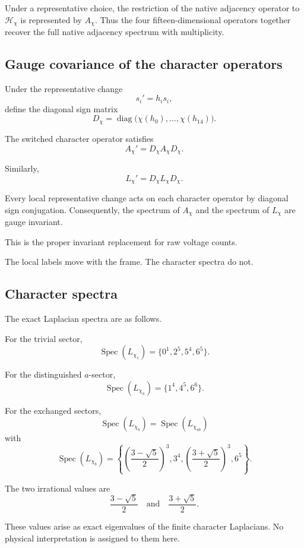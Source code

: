 Under a representative choice, the restriction of the native
adjacency operator to \(\mathcal H_\chi\) is represented by
\(A_\chi\). Thus the four fifteen-dimensional operators together
recover the full native adjacency spectrum with multiplicity.

\subsection{Gauge covariance of the character operators}

Under the representative change
\[
s_i'=h_i s_i,
\]
define the diagonal sign matrix
\[
D_\chi
=
\operatorname{diag}
\bigl(
\chi(h_0),\ldots,\chi(h_{14})
\bigr).
\]

The switched character operator satisfies
\[
A_\chi'
=
D_\chi A_\chi D_\chi.
\]

Similarly,
\[
L_\chi'
=
D_\chi L_\chi D_\chi.
\]

\begin{theorem}
Every local representative change acts on each character operator by
diagonal sign conjugation. Consequently, the spectrum of \(A_\chi\)
and the spectrum of \(L_\chi\) are gauge invariant.
\end{theorem}

This is the proper invariant replacement for raw voltage counts.

The local labels move with the frame. The character spectra do not.

\subsection{Character spectra}

The exact Laplacian spectra are as follows.

For the trivial sector,
\[
\operatorname{Spec}(L_{\chi_1})
=
\{0^1,2^5,5^4,6^5\}.
\]

For the distinguished \(a\)-sector,
\[
\operatorname{Spec}(L_{\chi_a})
=
\{1^4,4^5,6^6\}.
\]

For the exchanged sectors,
\[
\operatorname{Spec}(L_{\chi_b})
=
\operatorname{Spec}(L_{\chi_{ab}})
\]
with
\[
\operatorname{Spec}(L_{\chi_b})
=
\left\{
\left(\frac{3-\sqrt5}{2}\right)^3,
3^4,
\left(\frac{3+\sqrt5}{2}\right)^3,
6^5
\right\}.
\]

The two irrational values are
\[
\frac{3-\sqrt5}{2}
\quad\text{and}\quad
\frac{3+\sqrt5}{2}.
\]

These values arise as exact eigenvalues of the finite character
Laplacians. No physical interpretation is assigned to them here.

